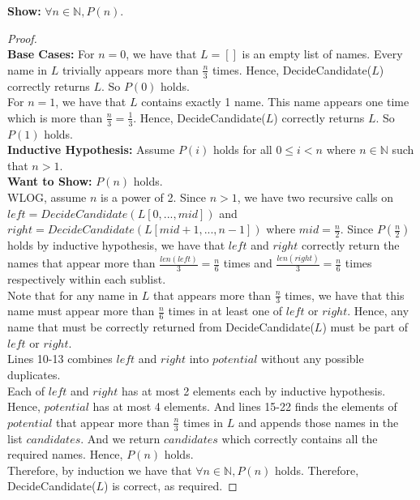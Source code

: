 \documentclass[12pt]{article}
\newcommand{\N}{\mathbb{N}}
\begin{document}
\textbf{Show:} $\forall n \in \N, P(n)$. 

\begin{proof}
\\
\textbf{Base Cases:} For $n = 0$, we have that $L = []$ is an empty list of names. Every name in $L$ trivially appears more than $\frac{n}{3}$ times. Hence, DecideCandidate($L$) correctly returns $L$. So $P(0)$ holds. \\

For $n = 1$, we have that $L$ contains exactly 1 name. This name appears one time which is more than $\frac{n}{3} = \frac{1}{3}$. Hence, DecideCandidate($L$) correctly returns $L$. So $P(1)$ holds. \\

\textbf{Inductive Hypothesis:} Assume $P(i)$ holds for all $0 \leq i < n$ where $n \in \N$ such that $n > 1$. \\

\textbf{Want to Show:} $P(n)$ holds. \\

WLOG, assume $n$ is a power of 2. Since $n > 1$, we have two recursive calls on $left = DecideCandidate(L[0,...,mid])$ and $right = DecideCandidate(L[mid+1,...,n-1])$ where $mid = \frac{n}{2}$. Since $P(\frac{n}{2})$ holds by inductive hypothesis, we have that $left$ and $right$ correctly return the names that appear more than $\frac{len(left)}{3} = \frac{n}{6}$ times and $\frac{len(right)}{3} = \frac{n}{6}$ times respectively within each sublist. \\

Note that for any name in $L$ that appears more than $\frac{n}{3}$ times, we have that this name must appear more than $\frac{n}{6}$ times in at least one of $left$ or $right$. Hence, any name that must be correctly returned from DecideCandidate($L$) must be part of $left$ or $right$. \\

Lines 10-13 combines $left$ and $right$ into $potential$ without any possible duplicates. \\

Each of $left$ and $right$ has at most 2 elements each by inductive hypothesis. Hence, $potential$ has at most 4 elements. And lines 15-22 finds the elements of $potential$ that appear more than $\frac{n}{3}$ times in $L$ and appends those names in the list $candidates$. And we return $candidates$ which correctly contains all the required names. Hence, $P(n)$ holds. \\

Therefore, by induction we have that $\forall n \in \N, P(n)$ holds. Therefore, DecideCandidate($L$) is correct, as required. 
\end{proof}
\end{document}
